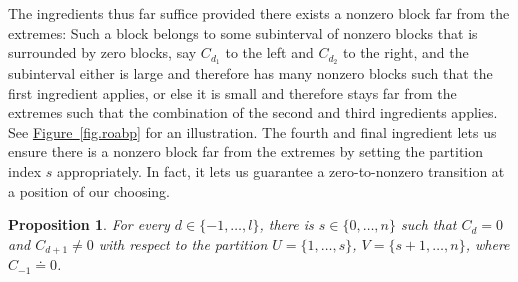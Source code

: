 \documentclass[11pt]{article}
\numberwithin{equation}{section}
\newtheorem{proposition}[theorem]{Proposition}
\theoremstyle{definition}
\theoremstyle{plain}
\newcommand{\expref}[2]{\hyperref[#2]{#1~\ref{#2}}}
\begin{document}
The ingredients thus far suffice provided there exists a nonzero block far from the extremes:
Such a block belongs to some subinterval of nonzero blocks that is surrounded by zero blocks, say $C_{d_1}$ to the left and $C_{d_2}$ to the right, and the subinterval either is large and therefore has many nonzero blocks such that the first ingredient applies, or else it is small and therefore stays far from the extremes such that the combination of the second
and third ingredients applies. See \expref{Figure}{fig.roabp} for an illustration.
The fourth and final ingredient lets us ensure there is a nonzero block far from the extremes by setting the partition index $s$ appropriately.
In fact, it lets us guarantee a zero-to-nonzero transition at a position of our choosing.

\begin{proposition} \label{prop:ROABP:dselect}
  For every $d \in \{-1,\dots,l\}$, there is $s \in \{0,\dots,n\}$ such that $C_d=0$ and $C_{d+1} \ne 0$
  with respect to the partition \(U=\{1,\ldots,s\}\),
  \(V=\{{s+1},\ldots,n\}\), where $C_{-1} \doteq 0$.
\end{proposition}
\end{document}
